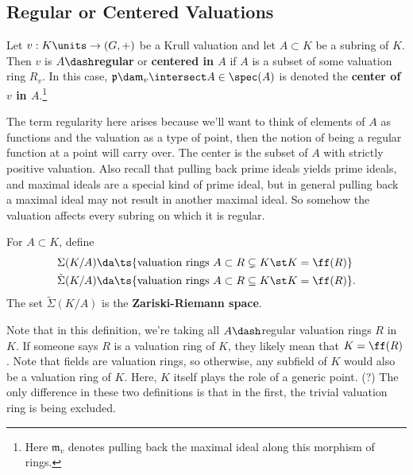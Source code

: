 \hypertarget{regular-or-centered-valuations}{%
\subsection{Regular or Centered
Valuations}\label{regular-or-centered-valuations}}

\begin{definition}

Let \(v:K\units \to (G, +)\) be a Krull valuation and let
\(A \subset K\) be a subring of \(K\). Then \(v\) is
\textbf{\(A\dash\)regular} or \textbf{centered in \(A\)} if \(A\) is a
subset of some valuation ring \(R_v\). In this case,
\(\mathfrak{p} \da \mathfrak{m}_v \intersect A \in \spec(A)\) is denoted
the \textbf{center of \(v\) in \(A\)}.\footnote{Here \(\mathfrak{m}_v\)
  denotes pulling back the maximal ideal along this morphism of rings.}

\end{definition}

\begin{remark}

The term regularity here arises because we'll want to think of elements
of \(A\) as functions and the valuation as a type of point, then the
notion of being a regular function at a point will carry over. The
center is the subset of \(A\) with strictly positive valuation. Also
recall that pulling back prime ideals yields prime ideals, and maximal
ideals are a special kind of prime ideal, but in general pulling back a
maximal ideal may not result in another maximal ideal. So somehow the
valuation affects every subring on which it is regular.

\end{remark}

\begin{definition}

For \(A \subset K\), define
\begin{align*}  
\Sigma(K/A) &\da \ts{\text{valuation rings } A \subset R \subsetneq K \st K = \ff(R)} \\
\tilde \Sigma(K/A) &\da \ts{\text{valuation rings } A \subset R \subseteq K \st K = \ff(R)}
.\end{align*} The set \(\tilde \Sigma(K/A)\) is the
\textbf{Zariski-Riemann space}.

\end{definition}

\begin{remark}

Note that in this definition, we're taking all \(A\dash\)regular
valuation rings \(R\) in \(K\). If someone says \(R\) is a valuation
ring of \(K\), they likely mean that \(K = \ff(R)\). Note that fields
are valuation rings, so otherwise, any subfield of \(K\) would also be a
valuation ring of \(K\). Here, \(K\) itself plays the role of a generic
point. (?) The only difference in these two definitions is that in the
first, the trivial valuation ring is being excluded.

\end{remark}

